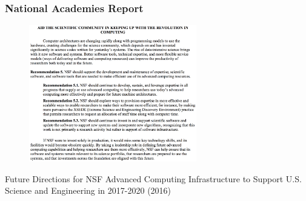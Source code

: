 \begin{frame}
\frametitle{National Academies Report}

\begin{figure}[htbp]
\begin{center}
\includegraphics[width=0.65\textwidth]{images/NAS-recommendation-software.png}
\label{fig:nsfsi2}
\end{center}
\end{figure}

\small{Future Directions for NSF Advanced Computing Infrastructure to Support U.S. Science and Engineering in 2017-2020 (2016)}
\end{frame}


